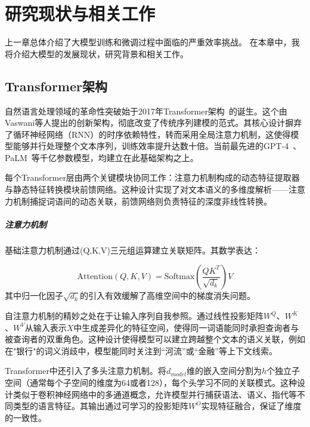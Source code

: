 
\chapter{研究现状与相关工作}

上一章总体介绍了大模型训练和微调过程中面临的严重效率挑战。
在本章中，我将介绍大模型的发展现状，研究背景和相关工作。


\section{Transformer架构}
自然语言处理领域的革命性突破始于2017年Transformer架构~\cite{Vaswani+2017}的诞生。这个由Vaswani等人提出的创新架构，彻底改变了传统序列建模的范式。其核心设计摒弃了循环神经网络（RNN）的时序依赖特性，转而采用全局注意力机制，这使得模型能够并行处理整个文本序列，训练效率提升达数十倍。当前最先进的GPT-4~\cite{openai2023gpt4}、PaLM~\cite{chowdhery2023palm}等千亿参数模型，均建立在此基础架构之上。

每个Transformer层由两个关键模块协同工作：注意力机制构成的动态特征提取器与静态特征转换模块前馈网络。这种设计实现了对文本语义的多维度解析——注意力机制捕捉词语间的动态关联，前馈网络则负责特征的深度非线性转换。

\paragraph{注意力机制}
基础注意力机制通过(Q,K,V)三元组运算建立关联矩阵。其数学表达：

\begin{equation}
    \text{Attention}(Q, K, V) = \text{Softmax}(\frac{QK^T}{\sqrt{d_k}})V
\end{equation}
其中归一化因子$\sqrt{d_k}$的引入有效缓解了高维空间中的梯度消失问题。

自注意力机制的精妙之处在于让输入序列自我参照。通过线性投影矩阵$W^Q$、$W^K$、$W^V$从输入表示$X$中生成差异化的特征空间，使得同一词语能同时承担查询者与被查询者的双重角色。这种设计使得模型可以建立跨越整个文本的语义关联，例如在"银行"的词义消歧中，模型能同时关注到“河流”或“金融”等上下文线索。

Transformer中还引入了多头注意力机制。将$d_{model}$维的嵌入空间分割为$h$个独立子空间（通常每个子空间的维度为64或者128），每个头学习不同的关联模式。这种设计类似于卷积神经网络中的多通道概念，允许模型并行捕获语法、语义、指代等不同类型的语言特征。其输出通过可学习的投影矩阵$W^O$实现特征融合，保证了维度的一致性。

